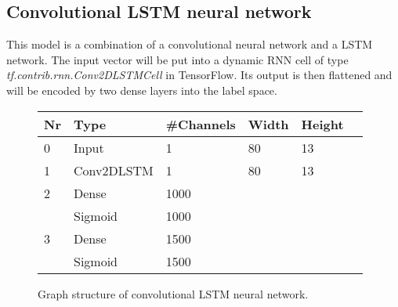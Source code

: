 \subsection*{Convolutional LSTM neural network}
This model is a combination of a convolutional neural network and a LSTM network. The input vector will be put into a dynamic RNN cell of type \newline\textit{tf.contrib.rnn.Conv2DLSTMCell} in TensorFlow. Its output is then flattened and will be encoded by two dense layers into the label space.
\begin{figure}[h]
	\centering
	\begin{tabular}{|l|l|l|l|l|l|}
		\hline \textbf{Nr} & \textbf{Type} & \textbf{\#Channels} & \textbf{Width} & \textbf{Height} \\ \hline
		0 & Input & 1 & 80 & 13 \\ \hline
		1 & Conv2DLSTM & 1 & 80 & 13 \\ \hline
		2 & Dense & 1000 & & \\ \hline
		& Sigmoid & 1000 & & \\ \hline
		3 & Dense & 1500 & & \\ \hline
		& Sigmoid & 1500 & & \\ \hline
	\end{tabular}
	\caption[Convolutional LSTM structure]{Graph structure of convolutional LSTM neural network.}
\end{figure}
\FloatBarrier

